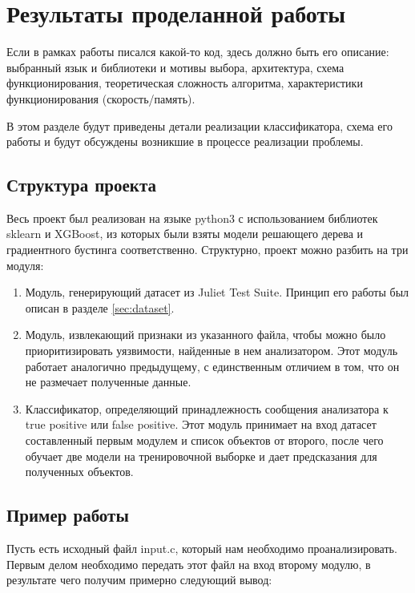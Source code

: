 \section{Результаты проделанной работы}
\label{sec:Chapter4} 
Если в рамках работы писался какой-то код, здесь должно быть его описание: выбранный язык и библиотеки и мотивы выбора, архитектура, схема функционирования, теоретическая сложность алгоритма, характеристики функционирования (скорость/память).

В этом разделе будут приведены детали реализации классификатора, схема его работы и будут обсуждены возникшие в процессе реализации проблемы.

\subsection{Структура проекта}

Весь проект был реализован на языке python3 с использованием библиотек sklearn и XGBoost, из которых были взяты модели решающего дерева и градиентного бустинга соответственно. Структурно, проект можно разбить на три модуля:

\begin{enumerate}
    \item Модуль, генерирующий датасет из Juliet Test Suite. Принцип его работы был описан в разделе \ref{sec:dataset}.
    \item Модуль, извлекающий признаки из указанного файла, чтобы можно было приоритизировать уязвимости, найденные в нем анализатором. Этот модуль работает аналогично предыдущему, с единственным отличием в том, что он не размечает полученные данные.
    \item Классификатор, определяющий принадлежность сообщения анализатора к true positive или false positive. Этот модуль принимает на вход датасет составленный первым модулем и список объектов от второго, после чего обучает две модели на тренировочной выборке и дает предсказания для полученных объектов.
\end{enumerate}

\subsection{Пример работы}

Пусть есть исходный файл input.c, который нам необходимо проанализировать. Первым делом необходимо передать этот файл на вход второму модулю, в результате чего получим примерно следующий вывод:


